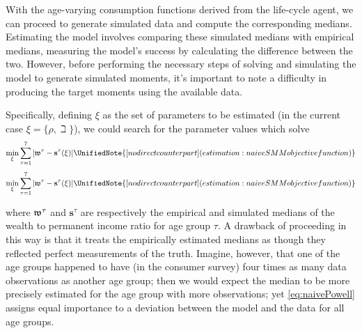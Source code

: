 \documentclass[titlepage, headings=optiontotocandhead]{econark}
\begin{document}
{With the age-varying consumption functions derived from the life-cycle agent, we can proceed to generate simulated data and compute the corresponding medians.  Estimating the model involves comparing these simulated medians with empirical medians, measuring the model's success by calculating the difference between the two.  However, before performing the necessary steps of solving and simulating the model to generate simulated moments, it's important to note a difficulty in producing the target moments using the available data.

Specifically, defining $\xi$ as the set of parameters
to be estimated (in the current case $\xi =\{\rho ,\beth\}$), we could search for
the parameter values which solve
  \begin{equation}
    \begin{gathered}
      \begin{aligned}
        \min_{\xi} \sum_{\tau=1}^{7} |\wRatio^{\tau} -\mathbf{s}^{\tau}(\xi)|  \label{eq:naivePowell}
        \UnifiedNote{[no direct counterpart] (estimation: naive SMM objective function)}
      \end{aligned}
    \end{gathered}
  \end{equation}
  \begin{equation}
    \begin{gathered}
      \begin{aligned}
        \min_{\xi} \sum_{\tau=1}^{7} |\wRatio^{\tau} -\mathbf{s}^{\tau}(\xi)|  \label{eq:naivePowell}
        \UnifiedNote{[no direct counterpart] (estimation: naive SMM objective function)}
      \end{aligned}
    \end{gathered}
  \end{equation}

where $\mathfrak{w}^{\tau}$ and $\mathbf{s}^{\tau}$ are respectively the empirical
and simulated medians of the wealth to permanent income ratio for age group $\tau$.
A drawback of proceeding in this way is that it treats the empirically
estimated medians as though they reflected perfect measurements of the
truth. Imagine, however, that one of the age groups happened to have
(in the consumer survey) four times as many data observations as
another age group; then we would expect the median to be more
precisely estimated for the age group with more observations; yet
\eqref{eq:naivePowell} assigns equal importance to a deviation between
the model and the data for all age groups.

}
\end{document}
